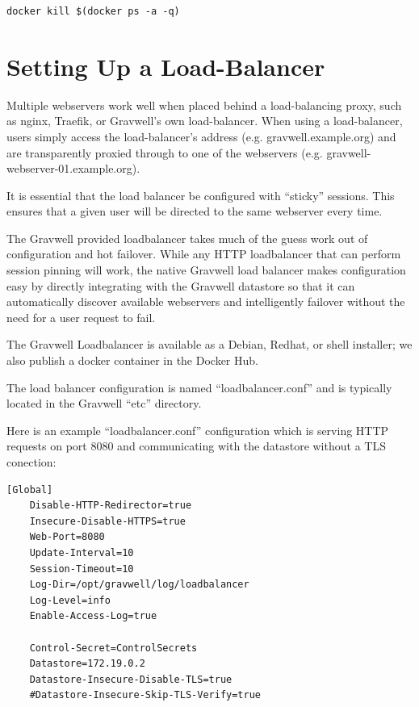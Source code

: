 \begin{Verbatim}[breaklines=true]
docker kill $(docker ps -a -q)
\end{Verbatim}



\section{Setting Up a Load-Balancer}
Multiple webservers work well when placed behind a load-balancing
proxy, such as nginx, Traefik, or Gravwell's own load-balancer. 
When using a load-balancer, users simply access
the load-balancer's address (e.g. gravwell.example.org) and are
transparently proxied through to one of the webservers (e.g.
gravwell-webserver-01.example.org).

It is essential that the load balancer be configured with ``sticky''
sessions. This ensures that a given user will be directed to the same
webserver every time.

The Gravwell provided loadbalancer takes much of the guess work out of
configuration and hot failover.  While any HTTP loadbalancer that can
perform session pinning will work, the native Gravwell load balancer
makes configuration easy by directly integrating with the Gravwell
datastore so that it can automatically discover available webservers
and intelligently failover without the need for a user request to fail.

The Gravwell Loadbalancer is available as a Debian, Redhat, or shell
installer; we also publish a docker container in the Docker Hub.

The load balancer configuration is named ``loadbalancer.conf'' and is
typically located in the Gravwell ``etc'' directory.

Here is an example ``loadbalancer.conf'' configuration which is serving
HTTP requests on port 8080 and communicating with the datastore without
a TLS conection:


\begin{Verbatim}[breaklines=true]
[Global]
	Disable-HTTP-Redirector=true
	Insecure-Disable-HTTPS=true
	Web-Port=8080
	Update-Interval=10
	Session-Timeout=10
	Log-Dir=/opt/gravwell/log/loadbalancer
	Log-Level=info
	Enable-Access-Log=true

	Control-Secret=ControlSecrets
	Datastore=172.19.0.2
	Datastore-Insecure-Disable-TLS=true
	#Datastore-Insecure-Skip-TLS-Verify=true
\end{Verbatim}

